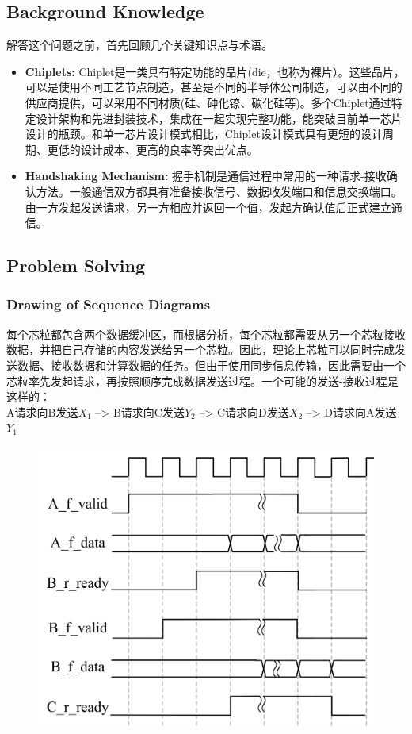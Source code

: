 \documentclass[11pt, a4 paper]{article}
\begin{document}
\subsection{Background Knowledge}
解答这个问题之前，首先回顾几个关键知识点与术语。
\begin{itemize}
    \item \textbf{Chiplets:} Chiplet是一类具有特定功能的晶片(die，也称为裸片）。这些晶片，可以是使用不同工艺节点制造，甚至是不同的半导体公司制造，可以由不同的供应商提供，可以采用不同材质(硅、砷化镣、碳化硅等)。多个Chiplet通过特定设计架构和先进封装技术，集成在一起实现完整功能，能突破目前单一芯片设计的瓶颈。和单一芯片设计模式相比，Chiplet设计模式具有更短的设计周期、更低的设计成本、更高的良率等突出优点。
    \item \textbf{Handshaking Mechanism:} 握手机制是通信过程中常用的一种请求-接收确认方法。一般通信双方都具有准备接收信号、数据收发端口和信息交换端口。由一方发起发送请求，另一方相应并返回一个值，发起方确认值后正式建立通信。
    
\end{itemize}
\subsection{Problem Solving}
\subsubsection{Drawing of Sequence Diagrams}
每个芯粒都包含两个数据缓冲区，而根据分析，每个芯粒都需要从另一个芯粒接收数据，并把自己存储的内容发送给另一个芯粒。因此，理论上芯粒可以同时完成发送数据、接收数据和计算数据的任务。但由于使用同步信息传输，因此需要由一个芯粒率先发起请求，再按照顺序完成数据发送过程。一个可能的发送-接收过程是这样的：
\\A请求向B发送$X_1$ --> B请求向C发送$Y_2$ --> C请求向D发送$X_2$ --> D请求向A发送$Y_1$ 
\begin{figure}[h]
    \centering
    \includegraphics[width=0.7\linewidth]{image/time.png}
\end{figure}
\end{document}
